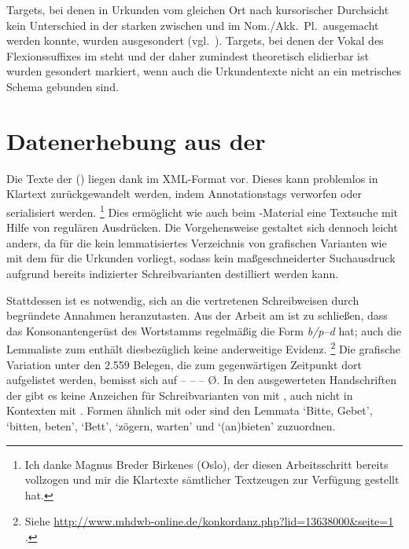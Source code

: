Targets, bei denen in Urkunden vom gleichen Ort nach kursorischer
Durchsicht kein Unterschied in der starken  zwischen
 und  im Nom./Akk.~Pl.\ ausgemacht werden konnte, wurden
ausgesondert (vgl.~). Targets, bei denen der Vokal des
Flexionssuffixes im  steht und der daher zumindest theoretisch
elidierbar ist \autocites[vgl.][90--91]{askedal1973}[191]{gjelsten1980} wurden
gesondert markiert, wenn auch die Urkundentexte nicht an ein metrisches Schema
gebunden sind.


\section{Datenerhebung aus der }

Die Texte der  (\KC) liegen dank 
\autocite{kcdigital} im XML-Format vor. Dieses kann problemlos in Klartext
zurückgewandelt werden, indem Annotationstags verworfen oder
serialisiert werden.%
%
	\footnote{Ich danke Magnus Breder Birkenes (Oslo), der diesen
	Arbeitsschritt bereits vollzogen und mir die Klartexte sämtlicher
	Textzeugen zur Verfügung gestellt hat.}
%
Dies ermöglicht wie auch beim \CAO{}-Material eine Textsuche mit Hilfe von
regulären Ausdrücken. Die Vorgehensweise gestaltet sich
dennoch leicht anders, da für die \KC{} kein lemmatisiertes Verzeichnis von
grafischen Varianten wie mit dem \WMU{} für die Urkunden vorliegt,
sodass kein maßgeschneiderter Suchausdruck aufgrund bereits indizierter
Schreibvarianten destilliert werden kann.

Stattdessen ist es notwendig, sich an die vertretenen Schreibweisen durch
begründete Annahmen heranzutasten. Aus der Arbeit am \CAO{} ist zu schließen,
dass das Konsonantengerüst des Wortstamms regelmäßig die Form \textit{b/p--d}
hat; auch die Lemmaliste zum  \autocite[s.\,v.~]{mwb1} enthält diesbezüglich keine
anderweitige Evidenz.%
%
	\footnote{Siehe
		\url{http://www.mhdwb-online.de/konkordanz.php?lid=13638000&seite=1}%
		.}
%
Die grafische Variation unter den 2.559 Belegen, die zum gegenwärtigen
Zeitpunkt dort aufgelistet werden, bemisst sich auf  --  --  --  Ø. In den ausgewerteten Handschriften der \KC{} gibt
es keine Anzeichen für Schreibvarianten von  mit , auch
nicht in Kontexten mit . Formen ähnlich  mit 
oder  sind den Lemmata  `Bitte, Gebet', 
`bitten, beten',  `Bett',  `zögern, warten' und
 `(an)bieten' zuzuordnen.

